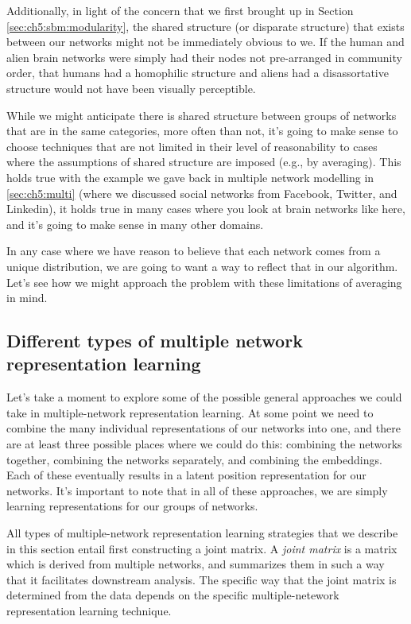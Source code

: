Additionally, in light of the concern that we first brought up in Section \ref{sec:ch5:sbm:modularity}, the shared structure (or disparate structure) that exists between our networks might not be immediately obvious to we. If the human and alien brain networks were simply had their nodes not pre-arranged in community order, that humans had a homophilic structure and aliens had a disassortative structure would not have been visually perceptible. 

While we might anticipate there is shared structure between groups of networks that are in the same categories, more often than not, it's going to make sense to choose techniques that are not limited in their level of reasonability to cases where the assumptions of shared structure are imposed (e.g., by averaging). This holds true with the example we gave back in multiple network modelling in \Section \ref{sec:ch5:multi} (where we discussed social networks from Facebook, Twitter, and Linkedin), it holds true in many cases where you look at brain networks like here, and it's going to make sense in many other domains.

In any case where we have reason to believe that each network comes from a unique distribution, we are going to want a way to reflect that in our algorithm. Let's see how we might approach the problem with these limitations of averaging in mind. 

\subsection{Different types of multiple network representation learning}

Let's take a moment to explore some of the possible general approaches we could take in multiple-network representation learning. At some point we need to combine the many individual representations of our networks into one, and there are at least three possible places where we could do this: combining the networks together, combining the networks separately, and combining the embeddings. Each of these eventually results in a latent position representation for our networks. It's important to note that in all of these approaches, we are simply learning representations for our groups of networks. 

All types of multiple-network representation learning strategies that we describe in this section entail first constructing a joint matrix. A \textit{joint matrix} is a matrix which is derived from multiple networks, and summarizes them in such a way that it facilitates downstream analysis. The specific way that the joint matrix is determined from the data depends on the specific multiple-netework representation learning technique.

